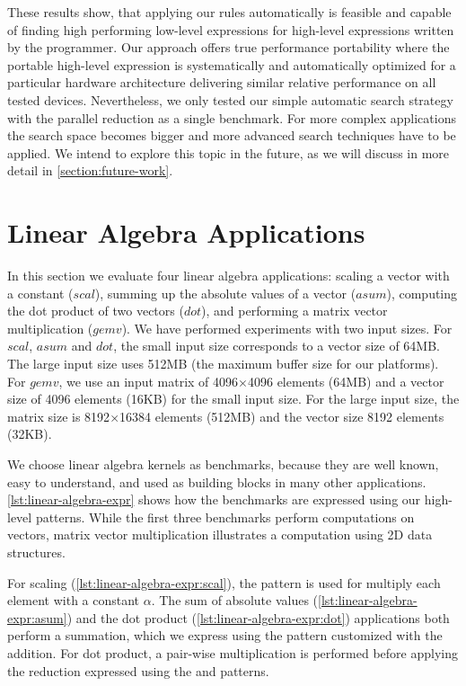 \bigskip

\noindent
These results show, that applying our rules automatically is feasible and capable of finding high performing low-level expressions for high-level expressions written by the programmer.
Our approach offers true performance portability where the portable high-level expression is systematically and automatically optimized for a particular hardware architecture delivering similar relative performance on all tested devices.
Nevertheless, we only tested our simple automatic search strategy with the parallel reduction as a single benchmark.
For more complex applications the search space becomes bigger and more advanced search techniques have to be applied.
We intend to explore this topic in the future, as we will discuss in more detail in \autoref{section:future-work}.




\section{Linear Algebra Applications}

In this section we evaluate four linear algebra applications: scaling a vector with a constant ($scal$), summing up the absolute values of a vector ($asum$), computing the dot product of two vectors ($dot$), and performing a matrix vector multiplication ($gemv$).
We have performed experiments with two input sizes.
For $scal$, $asum$ and $dot$, the small input size corresponds to a vector size of 64MB.
The large input size uses 512MB (the maximum \OpenCL buffer size for our platforms).
For $gemv$, we use an input matrix of 4096$\times$4096 elements (64MB) and a vector size of 4096 elements (16KB) for the small input size.
For the large input size, the matrix size is 8192$\times$16384 elements (512MB) and the vector size 8192 elements (32KB).

We choose linear algebra kernels as benchmarks, because they are well known, easy to understand, and used as building blocks in many other applications.
\autoref{lst:linear-algebra-expr} shows how the benchmarks are expressed using our high-level patterns.
While the first three benchmarks perform computations on vectors, matrix vector multiplication illustrates a computation using 2D data structures.

For scaling (\autoref{lst:linear-algebra-expr:scal}), the \map pattern is used for multiply each element with a constant $\alpha$.
The sum of absolute values (\autoref{lst:linear-algebra-expr:asum}) and the dot product (\autoref{lst:linear-algebra-expr:dot}) applications both perform a summation, which we express using the \reduce pattern customized with the addition.
For dot product, a pair-wise multiplication is performed before applying the reduction expressed using the \zip and \map patterns.

